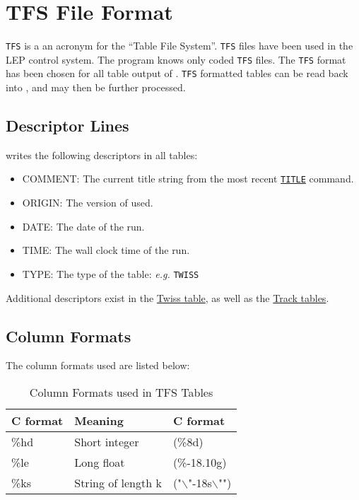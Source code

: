
\chapter{TFS File Format}
\label{chap:tfs}

\texttt{TFS}\cite{TFS} is a an acronym for the ``Table File
System''. \texttt{TFS} files have been used in the LEP control
system. The \mad program knows only coded \texttt{TFS} files. The
\texttt{TFS} format has been chosen for all table output of
\madx. \texttt{TFS} formatted tables can be read back into \madx, and
may then be further processed. 
 
\section{Descriptor Lines}
\label{sec:tfs_desc}

\madx writes the following descriptors in all tables: 
\begin{itemize}
   \item COMMENT: The current title string from the most recent 
   \hyperref[sec:title]{\texttt{TITLE}} command. 
   \item ORIGIN: The version of \madx used. 
   \item DATE: The date of the \madx run. 
   \item TIME: The wall clock time of the \madx run. 
   \item TYPE: The type of the table: \textsl{e.g.} \texttt{TWISS} 
\end{itemize} 

Additional descriptors exist in the \hyperref[chap:twiss]{Twiss table},
as well as the \hyperref[chap:thintrack]{Track tables}.  


\section{Column Formats}
\label{sec:tfs_columns}

The column formats used are listed below: 

\begin{table}[ht]
  \centering
  \caption{ Column Formats used in TFS Tables}    
  \vspace{1ex}
  \begin{tabular}{|l l l|}
    \hline
    \textbf{C format} & \textbf{Meaning} & \textbf{C format} \\ 
    \hline
    \%hd & Short integer & (\%8d) \\ 
    \%le & Long float & (\%-18.10g) \\ 
    \%ks & String of length k & ("$\backslash$"-18s$\backslash$"")\\
    \hline
  \end{tabular}
\end{table}

